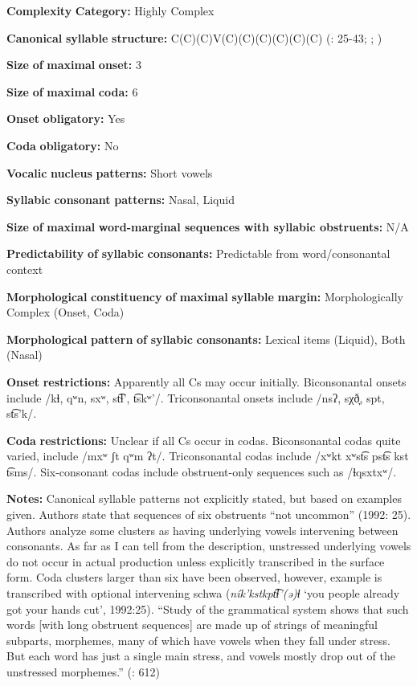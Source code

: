\begin{styleBody}
\textbf{Complexity} \textbf{Category:} Highly Complex

\textbf{Canonical} \textbf{syllable} \textbf{structure:} C(C)(C)V(C)(C)(C)(C)(C)(C) (\citealt{ThompsonThompson1992}: 25-43; \citealt{ThompsonThompson1996}; \citealt{ThompsonEtAl1996})

\textbf{Size} \textbf{of} \textbf{maximal} \textbf{onset:} 3

\textbf{Size} \textbf{of} \textbf{maximal} \textbf{coda:} 6

\textbf{Onset} \textbf{obligatory:} Yes

\textbf{Coda} \textbf{obligatory:} No

\textbf{Vocalic} \textbf{nucleus} \textbf{patterns:} Short vowels

\textbf{Syllabic} \textbf{consonant} \textbf{patterns:} Nasal, Liquid

\textbf{Size} \textbf{of} \textbf{maximal} \textbf{word{}-marginal sequences with syllabic obstruents:} N/A

\textbf{Predictability} \textbf{of} \textbf{syllabic} \textbf{consonants:} Predictable from word/consonantal context

\textbf{Morphological} \textbf{constituency} \textbf{of} \textbf{maximal} \textbf{syllable} \textbf{margin:} Morphologically Complex (Onset, Coda)

\textbf{Morphological} \textbf{pattern} \textbf{of} \textbf{syllabic} \textbf{consonants:} Lexical items (Liquid), Both (Nasal)

\textbf{Onset} \textbf{restrictions:} Apparently all Cs may occur initially. Biconsonantal onsets include /kɬ, qʷn, sxʷ, st͡ɬ’, t͡skʷ’/. Triconsonantal onsets include /nsʔ, sχð̞, spt, st͡s’k/.

\textbf{Coda} \textbf{restrictions:} Unclear if all Cs occur in codas. Biconsonantal codas quite varied, include /mxʷ ʃt qʷm ʔt/. Triconsonantal codas include /xʷkt xʷst͡s pst͡s kst t͡sms/. Six-consonant codas include obstruent-only sequences such as /ɬqsxtxʷ/.

\textbf{Notes:} Canonical syllable patterns not explicitly stated, but based on examples given. Authors state that sequences of six obstruents “not uncommon” (1992: 25). Authors analyze some clusters as having underlying vowels intervening between consonants. As far as I can tell from the description, unstressed underlying vowels do not occur in actual production unless explicitly transcribed in the surface form. Coda clusters larger than six have been observed, however, example is transcribed with optional intervening schwa (\textit{ník’kstkpt͡ɬ’(ə)ɬ} ‘you people already got your hands cut’, 1992:25). “Study of the grammatical system shows that such words [with long obstruent sequences] are made up of strings of meaningful subparts, morphemes, many of which have vowels when they fall under stress. But each word has just a single main stress, and vowels mostly drop out of the unstressed morphemes.” (\citealt{ThompsonEtAl1996}: 612)


\end{styleBody}
